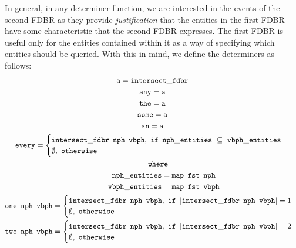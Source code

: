 \documentclass[../main.tex]{subfiles}
\begin{document}
In general, in any determiner function, we are interested in the events of the second FDBR as they provide {\em justification} that the entities in the first FDBR
have some characteristic that the second FDBR expresses.  The first FDBR is useful only for the entities contained within it as a way of specifying which entities should be queried.
With this in mind, we define the determiners as follows:\\
{\setlength{\mathindent}{0cm}
\allowdisplaybreaks
\begin{gather*}
\mathtt{a} = \mathtt{intersect\_fdbr} \\
\mathtt{any} = \mathtt{a} \\
\mathtt{the} = \mathtt{a}  \\
\mathtt{some} = \mathtt{a}   \\
\mathtt{an} = \mathtt{a}   \\
\mathtt{every} =
\begin{cases}
	\mathtt{intersect\_fdbr}\enspace \mathtt{nph}\enspace \mathtt{vbph},\ \mathtt{if}\enspace \mathtt{nph\_entities}\ \subseteq\ \mathtt{vbph\_entities} \\
	\mathtt{\emptyset},\ \mathtt{otherwise}
\end{cases} \\
\mathtt{\indent where} \\
\mathtt{\indent\indent nph\_entities} = \mathtt{map}\enspace \mathtt{fst}\enspace \mathtt{nph} \\
\mathtt{\indent\indent vbph\_entities} = \mathtt{map}\enspace \mathtt{fst}\enspace \mathtt{vbph} \\
\mathtt{one}\enspace \mathtt{nph}\enspace \mathtt{vbph} =
\begin{cases}
	\mathtt{intersect\_fdbr}\enspace \mathtt{nph}\enspace \mathtt{vbph},\ \mathtt{if}\ \left\vert\mathtt{intersect\_fdbr}\enspace \mathtt{nph}\enspace \mathtt{vbph}\right\vert = 1 \\
	\emptyset,\ \mathtt{otherwise}
\end{cases} \\
\mathtt{two}\enspace \mathtt{nph}\enspace \mathtt{vbph} =
\begin{cases}
\mathtt{intersect\_fdbr}\enspace \mathtt{nph}\enspace \mathtt{vbph},\ \mathtt{if}\ \left\vert\mathtt{intersect\_fdbr}\enspace \mathtt{nph}\enspace \mathtt{vbph}\right\vert = 2 \\
\emptyset,\ \mathtt{otherwise}
\end{cases} \\
\end{gather*}
}
\end{document}
